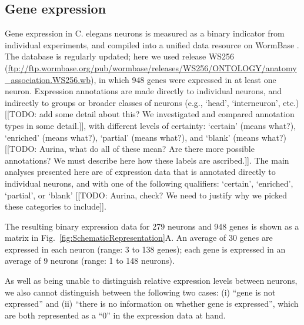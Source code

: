 \documentclass[10pt,letterpaper]{article}
\begin{document}
\subsection*{Gene expression}

Gene expression in C. elegans neurons is measured as a binary indicator from individual experiments, and compiled into a unified data resource on WormBase \cite{Harris:2009kd}.
The database is regularly updated; here we used release WS256 (\url{ftp://ftp.wormbase.org/pub/wormbase/releases/WS256/ONTOLOGY/anatomy_association.WS256.wb}), in which 948 genes were expressed in at least one neuron.
Expression annotations are made directly to individual neurons, and indirectly to groups or broader classes of neurons (e.g., `head', `interneuron', etc.) [[TODO: add some detail about this? We investigated and compared annotation types in some detail.]], with different levels of certainty: `certain' (means what?), `enriched' (means what?), `partial' (means what?), and `blank' (means what?) [[TODO: Aurina, what do all of these mean? Are there more possible annotations? We must describe here how these labels are ascribed.]].
The main analyses presented here are of expression data that is annotated directly to individual neurons, and with one of the following qualifiers: `certain', `enriched', `partial', or `blank' [[TODO: Aurina, check? We need to justify why we picked these categories to include]].

The resulting binary expression data for 279 neurons and 948 genes is shown as a matrix in Fig.~\ref{fig:SchematicRepresentation}A.
An average of 30 genes are expressed in each neuron (range: 3 to 138 genes); each gene is expressed in an average of 9 neurons (range: 1 to 148 neurons).

As well as being unable to distinguish relative expression levels between neurons, we also cannot distinguish between the following two cases: (i) ``gene is not expressed'' and (ii) ``there is no information on whether gene is expressed'', which are both represented as a ``0'' in the expression data at hand.


\end{document}
